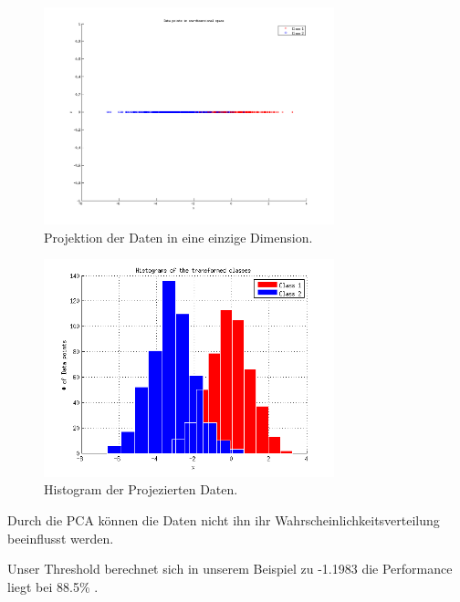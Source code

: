 \begin{figure}[h!]
  \begin{center}
    \includegraphics[width=0.75\textwidth]{./figures/4_one_dim}
    \caption{Projektion der Daten in eine einzige Dimension.}
    \label{fig:4_one_dim}
  \end{center}
\end{figure}

\begin{figure}[h!]
  \begin{center}
    \includegraphics[width=0.75\textwidth]{./figures/4_Histogram}
    \caption{Histogram der Projezierten Daten.}
    \label{fig:4_Histogram}
  \end{center}
\end{figure}


Durch die PCA können die Daten nicht ihn ihr Wahrscheinlichkeitsverteilung beeinflusst werden.

Unser Threshold berechnet sich in unserem Beispiel zu -1.1983 die Performance liegt bei 88.5\% .



